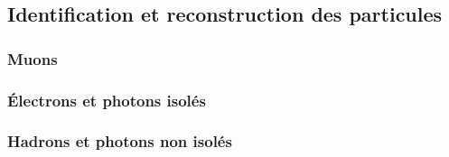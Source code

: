 \subsection{Identification et reconstruction des particules}\label{chapter-LHC-section-evt_reco-subsec-ptc_ID}

\subsubsection{Muons}

\subsubsection{Électrons et photons isolés}

\subsubsection{Hadrons et photons non isolés}